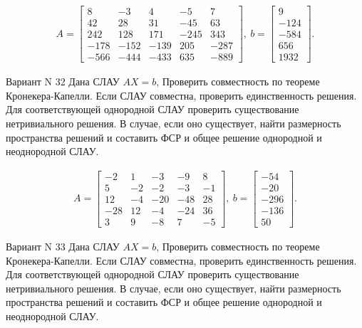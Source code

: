 \documentclass[11pt]{report}
\begin{document}
\begin{align*}
 A = \left[\begin{matrix}8 & -3 & 4 & -5 & 7\\42 & 28 & 31 & -45 & 63\\242 & 128 & 171 & -245 & 343\\-178 & -152 & -139 & 205 & -287\\-566 & -444 & -433 & 635 & -889\end{matrix}\right],
\ b = \left[\begin{matrix}9\\-124\\-584\\656\\1932\end{matrix}\right]. 
 \end{align*}

Вариант N 32
Дана СЛАУ $AX = b$,
Проверить совместность по теореме Кронекера-Капелли. Если СЛАУ совместна, проверить единственность решения.
Для соответствующей однородной СЛАУ проверить существование нетривиального решения. В случае, если оно существует,
найти размерность пространства решений и составить ФСР и общее решение однородной  и неоднородной СЛАУ.


\begin{align*}
 A = \left[\begin{matrix}-2 & 1 & -3 & -9 & 8\\5 & -2 & -2 & -3 & -1\\12 & -4 & -20 & -48 & 28\\-28 & 12 & -4 & -24 & 36\\3 & 9 & -8 & 7 & -5\end{matrix}\right],
\ b = \left[\begin{matrix}-54\\-20\\-296\\-136\\50\end{matrix}\right]. 
 \end{align*}

Вариант N 33
Дана СЛАУ $AX = b$,
Проверить совместность по теореме Кронекера-Капелли. Если СЛАУ совместна, проверить единственность решения.
Для соответствующей однородной СЛАУ проверить существование нетривиального решения. В случае, если оно существует,
найти размерность пространства решений и составить ФСР и общее решение однородной  и неоднородной СЛАУ.
\end{document}
